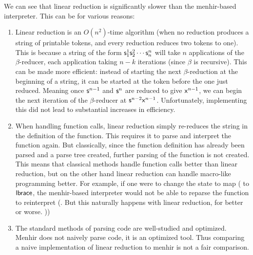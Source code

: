 \documentclass{llncs}
\newcounter{algo}
\begin{document}
We can see that linear reduction is significantly slower than the menhir-based interpreter.
This can be for various reasons:
\begin{enumerate}
    \item Linear reduction is an $O(n^2)$-time algorithm (when no reduction produces a string of printable tokens, and every reduction reduces two tokens to one).
        This is because a string of the form $\mathsf{s}^1_1\mathsf{s}^2_2\cdots\mathsf{s}^n_n$ will take $n$ applications of the $\beta$-reducer, each application taking $n-k$ iterations (since $\beta$ is recursive).
        This can be made more efficient: instead of starting the next $\beta$-reduction at the beginning of a string, it can be started at the token before the one just reduced.
        Meaning once $\mathsf{s}^{n-1}$ and $\mathsf{s}^n$ are reduced to give $\mathsf{x}^{n-1}$, we can begin the next iteration of the $\beta$-reducer at $\mathsf{s}^{n-2}\mathsf{x}^{n-1}$.
        Unfortunately, implementing this did not lead to substantial increases in efficiency.

    \item When handling function calls, linear reduction simply re-reduces the string in the definition of the function.
        This requires it to parse and interpret the function again.
        But classically, since the function definition has already been parsed and a parse tree created, further parsing of the function is not created.
        This means that classical methods handle function calls better than linear reduction, but on the other hand linear reduction can handle macro-like programming better.
        For example, if one were to change the state to map \ttt( to $\textsf{lbrace}$, the menhir-based interpreter would not be able to reparse the function to reinterpret \ttt(.
        But this naturally happens with linear reduction, for better or worse.
        \gobble)\gobble)

    \item The standard methods of parsing code are well-studied and optimized.
        Menhir does not naively parse code, it is an optimized tool.
        Thus comparing a naive implementation of linear reduction to menhir is not a fair comparison.
\end{enumerate}
\end{document}
